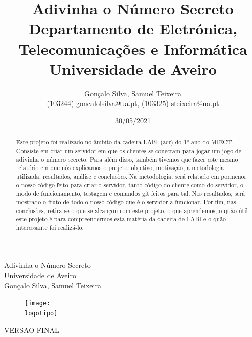 \documentclass{report}
\begin{document}
%
\def\titulo{Adivinha o Número Secreto}
\def\data{30/05/2021}
\def\autores{Gonçalo Silva, Samuel Teixeira}
\def\autorescontactos{(103244) goncalolsilva@ua.pt, (103325) steixeira@ua.pt}
\def\versao{VERSAO FINAL}
\def\departamento{Departamento de Eletrónica, Telecomunicações e Informática}
\def\empresa{Universidade de Aveiro}
\def\logotipo{ua.pdf}
%
%
\renewcommand{\contentsname}{Índice}
\begin{titlepage}

\begin{center}
%
\vspace*{50mm}
%
{\Huge \titulo}\\ 
%
\vspace{10mm}
%
{\Large \empresa}\\
%
\vspace{10mm}
%
{\LARGE \autores}\\ 
%
\vspace{30mm}
%
\begin{figure}[h]
\center
\texttt{[image: \\logotipo]}
\end{figure}
%
\vspace{30mm}
\end{center}
%
\begin{flushright}
\versao
\end{flushright}
\end{titlepage}

\title{%
{\Huge\textbf{\titulo}}\\
{\Large \departamento\\ \empresa}
}
%
\author{%
    \autores \\
    \autorescontactos
}
%
\date{\data}
%
\maketitle


\begin{abstract}
Este projeto foi realizado no âmbito da cadeira LABI (acr) do 1º ano do MIECT.
Consiste em criar um servidor em que os clientes se conectam para jogar um jogo de
adivinha o número secreto. Para além disso, também tivemos que fazer este mesmo 
relatório em que nós explicamos o projeto: objetivo, motivação, a metodologia utilizada, resultados, análise e
conclusões. Na metodologia, será relatado em pormenor o nosso código feito para criar o servidor, tanto
código do cliente como do servidor, o modo de funcionamento, testagem e comandos git feitos para tal.
Nos resultados, será mostrado o fruto de todo o nosso código que é o servidor a funcionar.
Por fim, nas conclusões, retira-se o que se alcançou com este projeto, o que aprendemos,
o quão útil este projeto é para compreendermos esta matéria da cadeira de LABI e o 
quão interessante foi realizá-lo.
\end{abstract}
\end{document}

